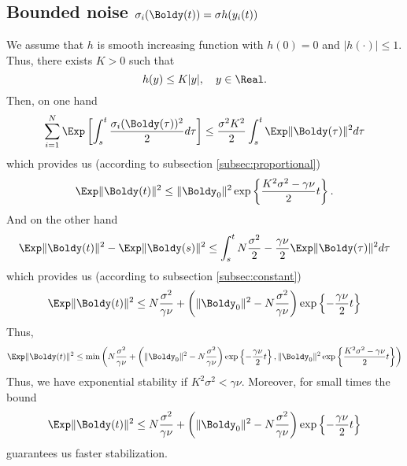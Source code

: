 \subsection{Bounded noise $\sigma_i(\Boldy(t)) = \sigma h(y_i(t))$}
We assume that $h$ is smooth increasing function with $h(0) = 0$ and $|h(\cdot)| \leq 1$. Thus, there exists $K > 0$ such that
\[
    h(y) \leq K |y|, \quad y \in \Real.
\]
Then, on one hand
\[
    \sum_{i=1}^N \Exp \left[ \int_s^{t} \frac{\sigma_i(\Boldy(\tau))^2}{2} d\tau\right] \leq \frac{\sigma^2 K^2}{2}\int_s^t \Exp \|\Boldy(\tau)\|^2 d \tau 
\]
which provides us (according to subsection \ref{subsec:proportional})
\[
    \Exp \|\Boldy(t)\|^2 \leq  \|\Boldy_0\|^2 \exp\left\{\frac{K^2\sigma^2 - \gamma \nu }{2} t \right\}.
\]
And on the other hand
\begin{equation*}
    \Exp \|\Boldy(t)\|^2  - \Exp \|\Boldy(s)\|^2 \leq  \int_s^t N \frac{\sigma^2}{2} - \frac{\gamma \nu }{2} \Exp \|\Boldy(\tau)\|^2 d\tau
\end{equation*}
which provides us (according to subsection \ref{subsec:constant})
\[
    \Exp \|\Boldy(t)\|^2 \leq N \frac{\sigma^2}{\gamma \nu} +  \left(\|\Boldy_0\|^2 - N \frac{\sigma^2}{\gamma \nu }\right) \exp \left\{-\frac{\gamma \nu }{2} t\right\} 
\]
Thus,
\[
    \Exp \|\Boldy(t)\|^2 \leq \min\left(N \frac{\sigma^2}{\gamma \nu} +  
    \left(\|\Boldy_0\|^2 - N \frac{\sigma^2}{\gamma \nu }\right) \exp \left\{-\frac{\gamma \nu }{2} t\right\},  
    \|\Boldy_0\|^2 \exp\left\{\frac{K^2\sigma^2 - \gamma \nu }{2} t \right\} \right)
\]
Thus, we have exponential stability if $K^2\sigma^2 < \gamma\nu$. Moreover, for small times the bound
\[
    \Exp \|\Boldy(t)\|^2 \leq N \frac{\sigma^2}{\gamma \nu} +  \left(\|\Boldy_0\|^2 - N \frac{\sigma^2}{\gamma \nu }\right) \exp \left\{-\frac{\gamma \nu }{2} t\right\}
\]
guarantees us faster stabilization.
